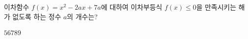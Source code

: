 \hspace*{2mm}\begin{minipage}[t]{\dimexpr\linewidth-2mm\relax}\vspace{0pt}
이차함수 $f(x)=x^2-2ax+7a$에 대하여 이차부등식 $f(x)\le 0$을 만족시키는 해가 없도록 하는 정수 $a$의 개수는?
\begin{choices32}{$5$}{$6$}{$7$}{$8$}{$9$}\end{choices32}\end{minipage}

